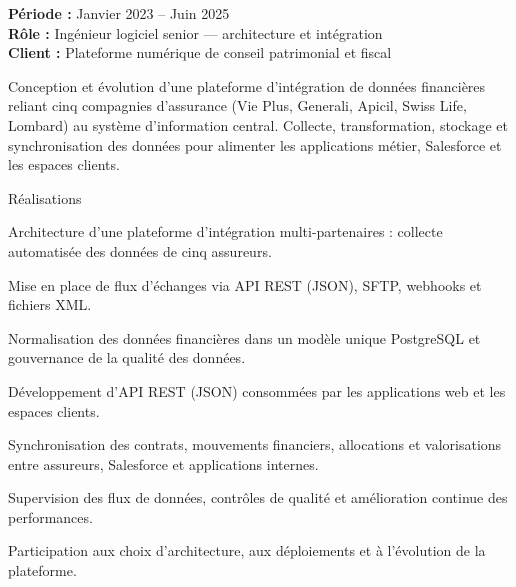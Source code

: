 \begin{cvgroup}

\end{cvgroup}

\begin{cvgroup}

\begin{cvmetadata}
\textbf{Période :} Janvier 2023 – Juin 2025 \\
\textbf{Rôle :} Ingénieur logiciel senior — architecture et intégration \\
\textbf{Client :} Plateforme numérique de conseil patrimonial et fiscal
\end{cvmetadata}

\begin{cvprojectsummary}
Conception et évolution d'une plateforme d'intégration de données financières reliant cinq compagnies d'assurance (Vie Plus, Generali, Apicil, Swiss Life, Lombard) au système d'information central. Collecte, transformation, stockage et synchronisation des données pour alimenter les applications métier, Salesforce et les espaces clients.
\end{cvprojectsummary}

\begin{cvdetailslist}{Réalisations}
  \item {Architecture d'une plateforme d'intégration multi-partenaires : collecte automatisée des données de cinq assureurs.}
  \item {Mise en place de flux d'échanges via API REST (JSON), SFTP, webhooks et fichiers XML.}
  \item {Normalisation des données financières dans un modèle unique PostgreSQL et gouvernance de la qualité des données.}
  \item {Développement d'API REST (JSON) consommées par les applications web et les espaces clients.}
  \item {Synchronisation des contrats, mouvements financiers, allocations et valorisations entre assureurs, Salesforce et applications internes.}
  \item {Supervision des flux de données, contrôles de qualité et amélioration continue des performances.}
  \item {Participation aux choix d'architecture, aux déploiements et à l'évolution de la plateforme.}
\end{cvdetailslist}


\end{cvgroup}

